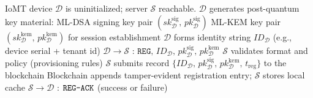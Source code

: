 \begin{algorithm}[!t]
\caption{Registration Phase}
\label{alg:registration}
\begin{algorithmic}[1]
\Require IoMT device $\mathcal{D}$ is uninitialized; server $\mathcal{S}$ reachable.
\State $\mathcal{D}$ generates post-quantum key material:
\State \quad ML-DSA signing key pair $(sk_{\mathcal{D}}^{\mathrm{sig}},\, pk_{\mathcal{D}}^{\mathrm{sig}})$
\State \quad ML-KEM key pair $(sk_{\mathcal{D}}^{\mathrm{kem}},\, pk_{\mathcal{D}}^{\mathrm{kem}})$ for session establishment
\State $\mathcal{D}$ forms identity string $ID_{\mathcal{D}}$ (e.g., device serial + tenant id)
\State $\mathcal{D} \rightarrow \mathcal{S}$ : $\texttt{REG},\, ID_{\mathcal{D}},\, pk_{\mathcal{D}}^{\mathrm{sig}},\, pk_{\mathcal{D}}^{\mathrm{kem}}$
\State $\mathcal{S}$ validates format and policy (provisioning rules)
\State $\mathcal{S}$ submits record $\{ID_{\mathcal{D}},\, pk_{\mathcal{D}}^{\mathrm{sig}},\, pk_{\mathcal{D}}^{\mathrm{kem}},\, t_{\mathrm{reg}}\}$ to the blockchain
\State Blockchain appends tamper-evident registration entry; $\mathcal{S}$ stores local cache
\State $\mathcal{S} \rightarrow \mathcal{D}$ : $\texttt{REG\text{-}ACK}$ (success or failure)
\end{algorithmic}
\end{algorithm}
